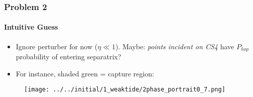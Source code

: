 \documentclass[dvipsnames, 11pt]{beamer}
\begin{document}
\begin{frame}
    \frametitle{Problem 2}
    \framesubtitle{Intuitive Guess}

    \begin{itemize}
        \item Ignore perturber for now ($\eta \ll 1$). Maybe: \emph{points
            incident on CS4} have $P_{hop}$ probability of entering separatrix?

        \item For instance, shaded green = capture region:
    \end{itemize}

    \begin{figure}[t]
        \centering
        \texttt{[image: ../../initial/1\_weaktide/2phase\_portrait0\_7.png]}
    \end{figure}
\end{frame}
\end{document}
